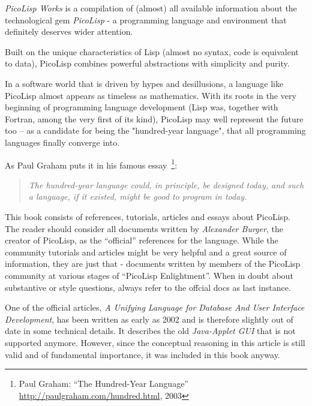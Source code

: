 %
%

\preface

\emph{PicoLisp Works} is a compilation of (almost) all available
information about the technological gem \emph{PicoLisp} - a
programming language and environment that definitely deserves wider
attention. 

Built on the unique characteristics of Lisp (almost no syntax, code is
equivalent to data), PicoLisp combines powerful abstractions with
simplicity and purity.

In a software world that is driven by hypes and desillusions, a
language like PicoLisp almost appears as timeless as mathematics. With
its roots in the very beginning of programming language development
(Lisp was, together with Fortran, among the very first of its kind),
PicoLisp may well represent the future too -- as a candidate for being
the "hundred-year language", that all programming languages finally
converge into. 

As Paul Graham puts it in his famous essay~\footnote{Paul Graham: ``The Hundred-Year Language'' \url{http://paulgraham.com/hundred.html}, 2003}:

\begin{verse}
  \textit{The hundred-year language could, in principle, be
    designed today, and such a language, if it existed, might be
    good to program in today.}  
\end{verse}

This book consists of references, tutorials, articles and essays about
PicoLisp. The reader should consider all documents written by
\emph{Alexander Burger}, the creator of PicoLisp, as the ``official''
references for the language. While the community tutorials and
articles might be very helpful and a great source of information,
they are just that - documents written by members of the PicoLisp
community at various stages of ``PicoLisp Enlightment''. When in doubt
about substantive or style questions, always refer to the offcial docs
as last instance. 

One of the official articles, \emph{A Unifying Language for Database
  And User Interface Development}, has been written as early as 2002
and is therefore slightly out of date in some technical details. It
describes the old \emph{Java-Applet GUI} that is not supported
anymore. However, since the conceptual reasoning in this article is
still valid and of fundamental importance, it was included in this
book anyway.

